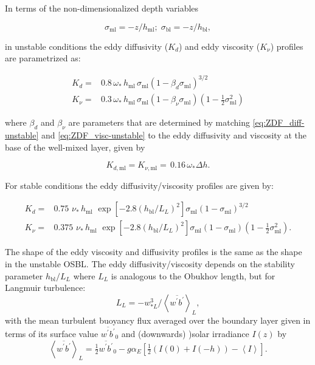 \documentclass[../main/NEMO_manual]{subfiles}
\begin{document}
In terms of the non-dimensionalized depth variables

\begin{equation}
  \label{eq:ZDF_sigma}
  \sigma_{\mathrm{ml}}= -z/h_{\mathrm{ml}}; \;\sigma_{\mathrm{bl}}= -z/h_{\mathrm{bl}},
\end{equation}

in unstable conditions the eddy diffusivity ($K_d$) and eddy viscosity ($K_\nu$) profiles are parametrized as:

\begin{align}
  \label{eq:ZDF_diff-unstable}
  K_d=&0.8\, \omega_*\, h_{\mathrm{ml}} \, \sigma_{\mathrm{ml}} \left(1-\beta_d \sigma_{\mathrm{ml}}\right)^{3/2}
  \\
  \label{eq:ZDF_visc-unstable}
  K_\nu =& 0.3\, \omega_* \,h_{\mathrm{ml}}\, \sigma_{\mathrm{ml}} \left(1-\beta_\nu \sigma_{\mathrm{ml}}\right)\left(1-\tfrac{1}{2}\sigma_{\mathrm{ml}}^2\right)
\end{align}

where $\beta_d$ and $\beta_\nu$ are parameters that are determined by matching \autoref{eq:ZDF_diff-unstable} and \autoref{eq:ZDF_visc-unstable} to the eddy diffusivity and viscosity at the base of the well-mixed layer, given by

\begin{equation}
  \label{eq:ZDF_diff-wml-base}
  K_{d,\mathrm{ml}}=K_{\nu,\mathrm{ml}}=\,0.16\,\omega_* \Delta h.
\end{equation}

For stable conditions the eddy diffusivity/viscosity profiles are given by:

\begin{align}
  \label{eq:ZDF_diff-stable}
  K_d= & 0.75\,\, \nu_*\, h_{\mathrm{ml}}\,\,  \exp\left[-2.8
       \left(h_{\mathrm{bl}}/L_L\right)^2\right]\sigma_{\mathrm{ml}}
       \left(1-\sigma_{\mathrm{ml}}\right)^{3/2} \\
  \label{eq:ZDF_visc-stable}
  K_\nu = & 0.375\,\,  \nu_*\, h_{\mathrm{ml}} \,\, \exp\left[-2.8 \left(h_{\mathrm{bl}}/L_L\right)^2\right] \sigma_{\mathrm{ml}} \left(1-\sigma_{\mathrm{ml}}\right)\left(1-\tfrac{1}{2}\sigma_{\mathrm{ml}}^2\right).
\end{align}

The shape of the eddy viscosity and diffusivity profiles is the same as the shape in the unstable OSBL. The eddy diffusivity/viscosity depends on the stability parameter $h_{\mathrm{bl}}/{L_L}$ where $ L_L$ is analogous to the Obukhov length, but for Langmuir turbulence:
\begin{equation}
  \label{eq:ZDF_L_L}
  L_L=-w_{*L}^3/\left<\overline{w^\prime b^\prime}\right>_L,
\end{equation}
with the mean turbulent buoyancy flux averaged over the boundary layer given in terms of its surface value $\overline{w^\prime b^\prime}_0$ and (downwards) )solar irradiance $I(z)$ by
\begin{equation}
  \label{eq:ZDF_stable-av-buoy-flux}
  \left<\overline{w^\prime b^\prime}\right>_L = \tfrac{1}{2} {\overline{w^\prime b^\prime}}_0-g\alpha_E\left[\tfrac{1}{2}(I(0)+I(-h))-\left<I\right>\right].
\end{equation}
\end{document}
